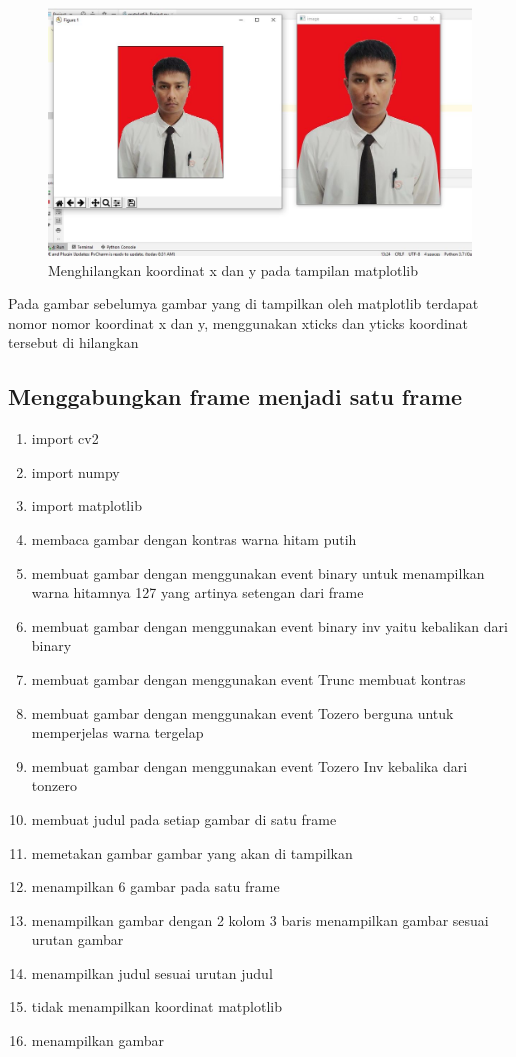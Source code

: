 \newpage
\begin{figure}[ht]
\centering
\includegraphics[scale=0.4]{figures/2,48.jpg}
\caption{Menghilangkan koordinat x dan y pada tampilan matplotlib}
\label{contoh}
\end{figure}
Pada gambar sebelumya gambar yang di tampilkan oleh matplotlib terdapat nomor nomor koordinat x dan y, menggunakan xticks dan yticks koordinat tersebut di hilangkan






\newpage
\subsection{Menggabungkan frame menjadi satu frame}

\begin{enumerate}
	\item import cv2
	\item import numpy
	\item import matplotlib
	\item membaca gambar dengan kontras warna hitam putih
	\item membuat gambar dengan menggunakan event binary untuk menampilkan warna hitamnya 127 yang artinya setengan dari frame
	\item membuat gambar dengan menggunakan event binary inv yaitu kebalikan dari binary
	\item membuat gambar dengan menggunakan event Trunc membuat kontras 
	\item membuat gambar dengan menggunakan event Tozero berguna untuk memperjelas warna tergelap
	\item membuat gambar dengan menggunakan event Tozero Inv kebalika dari tonzero
	\item membuat judul pada setiap gambar di satu frame
	\item memetakan gambar gambar yang akan di tampilkan
	\item menampilkan 6 gambar pada satu frame
	\item menampilkan gambar dengan 2 kolom 3 baris menampilkan gambar sesuai urutan gambar
	\item menampilkan judul sesuai urutan judul
	\item tidak menampilkan koordinat matplotlib
	\item menampilkan gambar
\end{enumerate}

